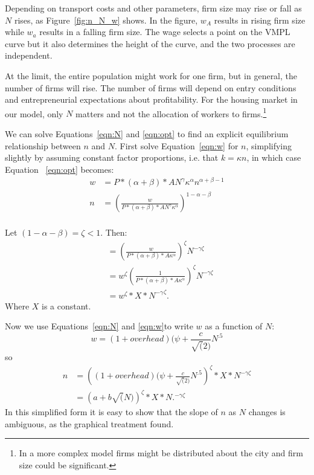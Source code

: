 Depending on transport costs and other parameters, firm size may rise or fall as $N$ rises, as Figure~\ref{fig:n_N_w} shows. In the figure, $w_A$ results in rising firm size while $w_a$ results in a falling firm size. The wage selects a point on the VMPL curve but it also determines the  height of the curve, and the two processes are independent.

At the limit, the entire population might work for one firm, but in general, the number of firms will rise. The number of firms will depend on entry conditions and entrepreneurial expectations about profitability. For the housing market in our model, only $N$ matters and not the allocation of workers to firms.\footnote{In a more complex model firms might be distributed about the city and firm size could be significant.}

We can solve Equations~\ref{eqn:N} and \ref{eqn:opt} to find an explicit equilibrium relationship between $n$ and $N$. First solve Equation~\ref{eqn:w} for $n$, simplifying slightly by assuming constant factor proportions, i.e. that  $k=\kappa n$, in which case Equation~ \ref{eqn:opt} becomes: 
\begin{align}\label{eqn:opt1}
w   &= P*(\alpha+\beta)*AN^\gamma \kappa^\alpha n^{\alpha+\beta-1} \\   
n  &=\left(\frac{w}{P*(\alpha+\beta)*AN^\gamma \kappa^\alpha}\right)^{1-\alpha-\beta} \\
\end{align}

Let $(1-\alpha-\beta) = \zeta <1.$ Then:
\begin{align}
    &=\left(\frac{w}{P*(\alpha+\beta)*A \kappa^\alpha}\right)^\zeta N^{-\gamma\zeta }\\
    &=w^\zeta\left(\frac{1}{P*(\alpha+\beta)*A \kappa^\alpha}\right)^\zeta N^{-\gamma\zeta }\\
    &=w^\zeta*X*{N^{-\gamma}}^\zeta.
\end{align}
Where $X$ is a constant.

Now we use Equations~\ref{eqn:N} and \ref{eqn:w}to write $w$ as a function of $N$:
\[w=(1+overhead)(\psi+\frac{c}{\sqrt(2)}N^{.5}\]
so
\begin{align}
    n &= \left((1+overhead)(\psi+\frac{c}{\sqrt(2)}N^{.5}\right)^\zeta*X*N^{-\gamma\zeta }\\
  &= \left(a+b\sqrt(N)\right)^\zeta*X*N.^{-\gamma\zeta }   
\end{align}
In this simplified form it is easy to show that the slope of $n$ as $N$ changes is ambiguous, as the graphical treatment found.


